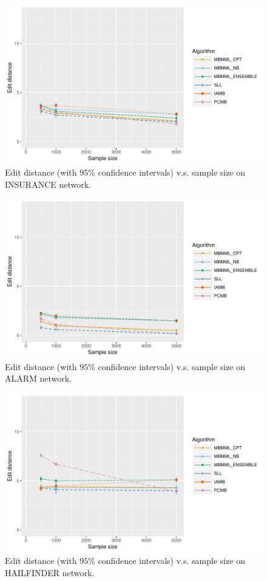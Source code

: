 \begin{figure}[H]
  \centering
    \includegraphics[scale=0.6]{figures/ed_vs_samplesize_insurance.pdf}
  \caption{Edit distance (with $95\%$ confidence intervals) v.s. sample size on INSURANCE network.}
\end{figure}

\begin{figure}[H]
  \centering
    \includegraphics[scale=0.6]{figures/ed_vs_samplesize_alarm.pdf}
  \caption{Edit distance (with $95\%$ confidence intervals) v.s. sample size on ALARM network.}
\end{figure}

\begin{figure}[H]
  \centering
    \includegraphics[scale=0.6]{figures/ed_vs_samplesize_hailfinder.pdf}
  \caption{Edit distance (with $95\%$ confidence intervals) v.s. sample size on HAILFINDER network.}
\end{figure}

